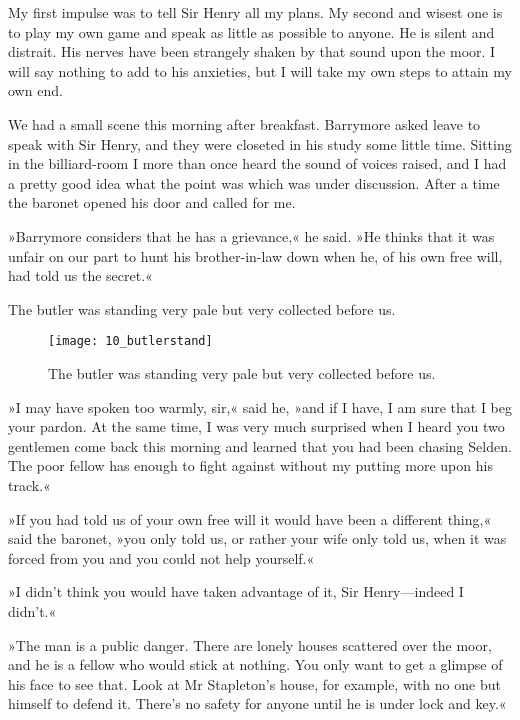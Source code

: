 
My first impulse was to tell Sir Henry all my plans. My second and wisest one is to play my own game and speak as little as possible to anyone. He is silent and distrait. His nerves have been strangely shaken by that sound upon the moor. I will say nothing to add to his anxieties, but I will take my own steps to attain my own end.

We had a small scene this morning after breakfast. Barrymore asked leave to speak with Sir Henry, and they were closeted in his study some little time. Sitting in the billiard-room I more than once heard the sound of voices raised, and I had a pretty good idea what the point was which was under discussion. After a time the baronet opened his door and called for me.

»Barrymore considers that he has a grievance,« he said. »He thinks that it was unfair on our part to hunt his brother-in-law down when he, of his own free will, had told us the secret.«

The butler was standing very pale but very collected before us.

	\begin{figure}[tbh]
		\centering
		\texttt{[image: 10\_butlerstand]}
		\caption{The butler was standing very pale but very collected before us.}
	\end{figure}


»I may have spoken too warmly, sir,« said he, »and if I have, I am sure that I beg your pardon. At the same time, I was very much surprised when I heard you two gentlemen come back this morning and learned that you had been chasing Selden. The poor fellow has enough to fight against without my putting more upon his track.«

»If you had told us of your own free will it would have been a different thing,« said the baronet, »you only told us, or rather your wife only told us, when it was forced from you and you could not help yourself.«

»I didn't think you would have taken advantage of it, Sir Henry—indeed I didn't.«

»The man is a public danger. There are lonely houses scattered over the moor, and he is a fellow who would stick at nothing. You only want to get a glimpse of his face to see that. Look at Mr Stapleton's house, for example, with no one but himself to defend it. There's no safety for anyone until he is under lock and key.«



